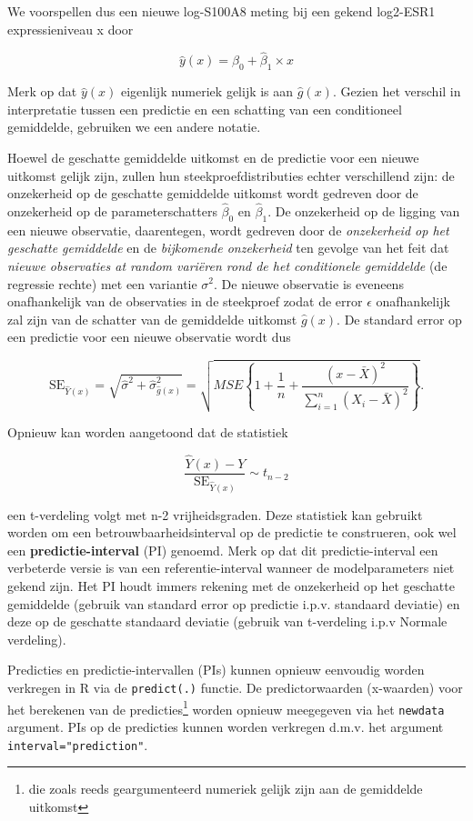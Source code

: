 \documentclass[
  dutch,
  letterpaper,
  12pt]{book}
\theoremstyle{definition}
\theoremstyle{definition}
\theoremstyle{definition}
\theoremstyle{remark}
\begin{document}
We voorspellen dus een nieuwe log-S100A8 meting bij een gekend log2-ESR1
expressieniveau x door

\[\hat{y}(x)=\hat{\beta}_0+\hat{\beta}_1 \times x\]

Merk op dat \(\hat{y}(x)\) eigenlijk numeriek gelijk is aan
\(\hat{g}(x)\). Gezien het verschil in interpretatie tussen een
predictie en een schatting van een conditioneel gemiddelde, gebruiken we
een andere notatie.

Hoewel de geschatte gemiddelde uitkomst en de predictie voor een nieuwe
uitkomst gelijk zijn, zullen hun steekproefdistributies echter
verschillend zijn: de onzekerheid op de geschatte gemiddelde uitkomst
wordt gedreven door de onzekerheid op de parameterschatters
\(\hat\beta_0\) en \(\hat\beta_1\). De onzekerheid op de ligging van een
nieuwe observatie, daarentegen, wordt gedreven door de \emph{onzekerheid
op het geschatte gemiddelde} en de \emph{bijkomende onzekerheid} ten
gevolge van het feit dat \emph{nieuwe observaties at random variëren
rond de het conditionele gemiddelde} (de regressie rechte) met een
variantie \(\sigma^2\). De nieuwe observatie is eveneens onafhankelijk
van de observaties in de steekproef zodat de error \(\epsilon\)
onafhankelijk zal zijn van de schatter van de gemiddelde uitkomst
\(\hat{g}(x)\). De standard error op een predictie voor een nieuwe
observatie wordt dus

\[\text{SE}_{\hat{Y}(x)}=\sqrt{\hat\sigma^2+\hat\sigma^2_{\hat{g}(x)}}=\sqrt{MSE\left\{1+\frac{1}{n}+\frac{(x-\bar X)^2}{\sum\limits_{i=1}^n (X_i-\bar X)^2}\right\}}.\]

Opnieuw kan worden aangetoond dat de statistiek

\[\frac{\hat{Y}(x)-Y}{\text{SE}_{\hat{Y}(x)}}\sim t_{n-2}\]

een t-verdeling volgt met n-2 vrijheidsgraden. Deze statistiek kan
gebruikt worden om een betrouwbaarheidsinterval op de predictie te
construeren, ook wel een \textbf{predictie-interval} (PI) genoemd. Merk
op dat dit predictie-interval een verbeterde versie is van een
referentie-interval wanneer de modelparameters niet gekend zijn. Het PI
houdt immers rekening met de onzekerheid op het geschatte gemiddelde
(gebruik van standard error op predictie i.p.v. standaard deviatie) en
deze op de geschatte standaard deviatie (gebruik van t-verdeling i.p.v
Normale verdeling).

Predicties en predictie-intervallen (PIs) kunnen opnieuw eenvoudig
worden verkregen in R via de \texttt{predict(.)} functie. De
predictorwaarden (x-waarden) voor het berekenen van de
predicties\footnote{die zoals reeds geargumenteerd numeriek gelijk zijn
  aan de gemiddelde uitkomst} worden opnieuw meegegeven via het
\texttt{newdata} argument. PIs op de predicties kunnen worden verkregen
d.m.v. het argument \texttt{interval="prediction"}.
\end{document}
